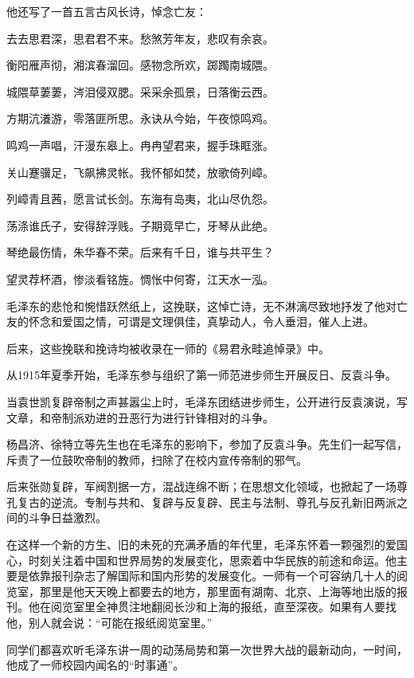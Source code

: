 \documentclass[../../dazhuan.tex]{subfiles}
\begin{document}
他还写了一首五言古风长诗，悼念亡友：

\begin{couplet}
去去思君深，思君君不来。愁煞芳年友，悲叹有余哀。

衡阳雁声彻，湘滨春溜回。感物念所欢，踯躅南城隈。

城隈草萋萋，涔泪侵双腮。采采余孤景，日落衡云西。

方期沆瀁游，零落匪所思。永诀从今始，午夜惊鸣鸡。

鸣鸡一声唱，汗漫东皋上。冉冉望君来，握手珠眶涨。

关山蹇骥足，飞飙拂灵帐。我怀郁如焚，放歌倚列嶂。

列嶂青且茜，愿言试长剑。东海有岛夷，北山尽仇怨。

荡涤谁氏子，安得辞浮贱。子期竟早亡，牙琴从此绝。

琴绝最伤情，朱华春不荣。后来有千日，谁与共平生？

望灵荐杯酒，惨淡看铭旌。惆怅中何寄，江天水一泓。
\end{couplet}



毛泽东的悲怆和惋惜跃然纸上，这挽联，这悼亡诗，无不淋漓尽致地抒发了他对亡友的怀念和爱国之情，可谓是文理俱佳，真挚动人，令人垂泪，催人上进。

后来，这些挽联和挽诗均被收录在一师的《易君永畦追悼录》中。

从1915年夏季开始，毛泽东参与组织了第一师范进步师生开展反日、反袁斗争。

当袁世凯复辟帝制之声甚嚣尘上时，毛泽东团结进步师生，公开进行反袁演说，写文章，和帝制派劝进的丑恶行为进行针锋相对的斗争。

杨昌济、徐特立等先生也在毛泽东的影响下，参加了反袁斗争。先生们一起写信，斥责了一位鼓吹帝制的教师，扫除了在校内宣传帝制的邪气。

后来张勋复辟，军阀割据一方，混战连绵不断；在思想文化领域，也掀起了一场尊孔复古的逆流。专制与共和、复辟与反复辟、民主与法制、尊孔与反孔新旧两派之间的斗争日益激烈。  

在这样一个新的方生、旧的未死的充满矛盾的年代里，毛泽东怀着一颗强烈的爱国心，时刻关注着中国和世界局势的发展变化，思索着中华民族的前途和命运。他主要是依靠报刊杂志了解国际和国内形势的发展变化。一师有一个可容纳几十人的阅览室，那里是他天天晚上都要去的地方，那里面有湖南、北京、上海等地出版的报刊。他在阅览室里全神贯注地翻阅长沙和上海的报纸，直至深夜。如果有人要找他，别人就会说：“可能在报纸阅览室里。”

同学们都喜欢听毛泽东讲一周的动荡局势和第一次世界大战的最新动向，一时间，他成了一师校园内闻名的“时事通”。
\end{document}
